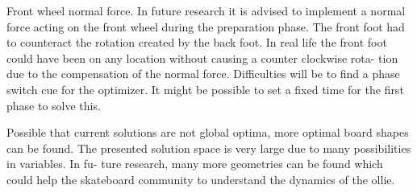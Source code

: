 \documentclass[default,iicol]{sn-jnl}
\begin{document}
Front wheel normal force. In future research it is advised to implement a normal force acting on the front wheel during the preparation phase. The front foot had to counteract the rotation created by the back foot. In real life the front foot could have been on any location without causing a counter clockwise rota- tion due to the compensation of the normal force. Difficulties will be to find a phase switch cue for the optimizer. It might be possible to set a fixed time for the first phase to solve this. 

Possible that current solutions are not global optima, more optimal board shapes can be found. The presented solution space is very large due to many possibilities in variables. In fu- ture research, many more geometries can be found which could help the skateboard community to understand the dynamics of the ollie.





\end{document}
